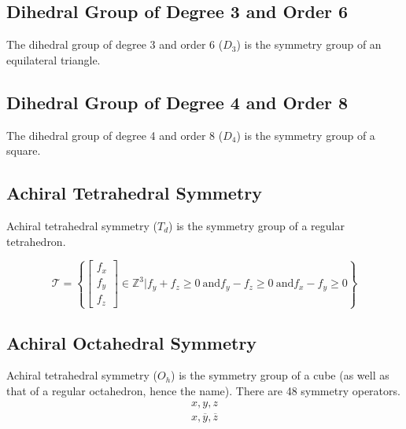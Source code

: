 \documentclass[acmtog]{acmart}
\begin{document}
\subsection{Dihedral Group of Degree 3 and Order 6}
The dihedral group of degree 3 and order 6 ($D_3$) is the symmetry group of an equilateral triangle.

\subsection{Dihedral Group of Degree 4 and Order 8}
The dihedral group of degree 4 and order 8 ($D_4$) is the symmetry group of a square.

\subsection{Achiral Tetrahedral Symmetry}
Achiral tetrahedral symmetry ($T_d$) is the symmetry group of a regular tetrahedron.

\begin{equation}
  \mathcal{T} = \left\{ \begin{bmatrix} f_x \\ f_y \\ f_z \end{bmatrix} \in \mathbb{Z}^3 | f_y + f_z \geq 0 \: \text{and} f_y - f_z \geq 0 \: \text{and} f_x - f_y \geq 0 \right\}
\end{equation}

\subsection{Achiral Octahedral Symmetry}
Achiral tetrahedral symmetry ($O_h$) is the symmetry group of a cube (as well as that of a regular octahedron, hence the name). There are 48 symmetry operators.
\begin{equation}
  \begin{split}
    x, y, z \\
    x, \overline{y}, \overline{z} \\
  \end{split}
\end{equation}
\end{document}
